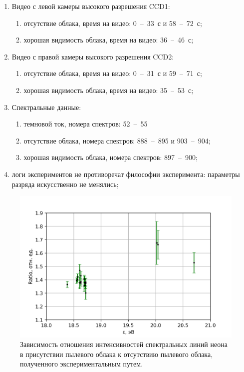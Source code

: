 \begin{enumerate}
    \item Видео с левой камеры высокого разрешения CCD1:
    \begin{enumerate}
        \item отсутствие облака, время на видео: 0~--~33~с и 58~--~72~с;
        \item хорошая видимость облака, время на видео: 36~--~46~с;
    \end{enumerate}
    \item Видео с правой камеры высокого разрешения CCD2:
    \begin{enumerate}
        \item отсутствие облака, время на видео: 0~--~31~с и 59~--~71~с;
        \item хорошая видимость облака, время на видео: 35~--~53~с;
    \end{enumerate}
    \item Спектральные данные:
    \begin{enumerate}
        \item темновой ток, номера спектров: 52~--~55
        \item отсутствие облака, номера спектров: 888~--~895 и 903~--~904;
        \item хорошая видимость облака, номера спектров: 897~--~900;
    \end{enumerate}
    \item логи экспериментов не противоречат философии эксперимента: параметры разряда искусственно не менялись;
\end{enumerate}

\begin{figure}[t]
    \centering
    \includegraphics[width=16cm]{figures/experimental_ratio}
    \caption{Зависимость отношения интенсивностей спектральных линий неона в присутствии пылевого облака к отсутствию пылевого облака, полученного экспериментальным путем.}
    \label{fig:experimental_ratio}
\end{figure}

